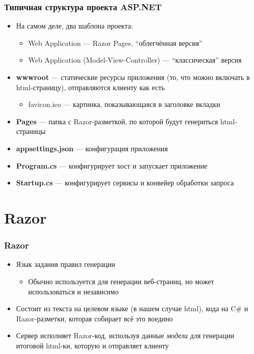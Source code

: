 \documentclass[xetex,mathserif,serif]{beamer}
\begin{document}
	\begin{frame}
		\frametitle{Типичная структура проекта ASP.NET}
		\begin{itemize}
			\item На самом деле, два шаблона проекта:
			\begin{itemize}
				\item Web Application --- Razor Pages, ``облегчённая версия''
				\item Web Application (Model-View-Controller) --- ``классическая'' версия
			\end{itemize}
			\item \textbf{wwwroot} --- статические ресурсы приложения (то, что можно включать в html-страницу), отправляются клиенту как есть
			\begin{itemize}
				\item favicon.ico --- картинка, показывающаяся в заголовке вкладки
			\end{itemize}
			\item \textbf{Pages} --- папка с Razor-разметкой, по которой будут генериться html-страницы
			\item \textbf{appsettings.json} --- конфигурация приложения
			\item \textbf{Program.cs} --- конфигурирует хост и запускает приложение
			\item \textbf{Startup.cs} --- конфигурирует сервисы и конвейер обработки запроса
		\end{itemize}
	\end{frame}

	\section{Razor}

	\begin{frame}
		\frametitle{Razor}
		\begin{itemize}
			\item Язык задания правил генерации
			\begin{itemize}
				\item Обычно используется для генерации веб-страниц, но может использоваться и независимо
			\end{itemize}
			\item Состоит из текста на целевом языке (в нашем случае html), кода на C\# и Razor-разметки, которая собирает всё это воедино
			\item Сервер исполняет Razor-код, используя данные \textit{модели} для генерации итоговой html-ки, которую и отправляет клиенту
		\end{itemize}
	\end{frame}
\end{document}
